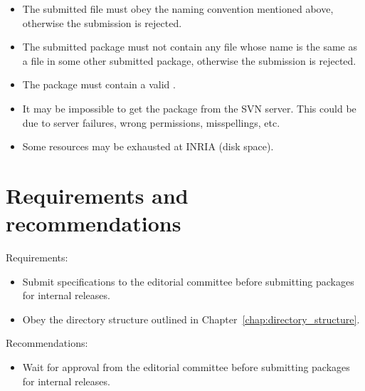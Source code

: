 {\begin{itemize}
\item The submitted file must obey the naming convention mentioned above,
      otherwise the submission is rejected.

\item The submitted package must not contain any file whose name is the same
      as a file in some other submitted package, otherwise the submission is
      rejected.

\item The package must contain a valid .

\item It may be impossible to get the package from the SVN server.
      This could be due to server failures, wrong permissions, misspellings,
      etc.

\item Some resources may be exhausted at INRIA (disk space).

\end{itemize}


\section{Requirements and recommendations\label{sec:submission_req_and_rec}}

\noindent
Requirements:
\begin{itemize}
   \item Submit specifications to the editorial committee before submitting
         packages for internal releases.
   \item Obey the directory structure outlined in Chapter~\ref{chap:directory_structure}.
\end{itemize}

\noindent
Recommendations:
\begin{itemize}
    \item Wait for approval from the editorial committee before submitting packages
          for internal releases.
\end{itemize}
}
